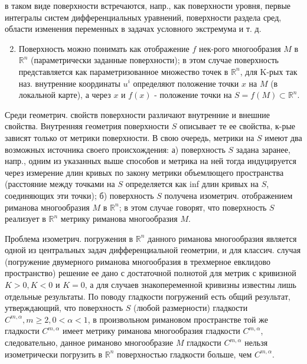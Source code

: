 \documentclass[10pt]{article}
\begin{document}
в таком виде поверхности встречаются, напр., как поверхности уровня, первые интегралы систем дифференциальных уравнений, поверхности раздела сред, области изменения переменных в задачах условного экстремума и т. д.



\begin{enumerate}

  \setcounter{enumi}{1}

  \item Поверхность можно понимать как отображение $f$ нек-рого многообразия $M$ в $\mathbb{R}^{n}$ (параметрически заданные поверхности); в этом случае поверхность представляется как параметризованное множество точек в $\mathbb{R}^{n}$, для K-рых так наз. внутренние координаты $u^{i}$ определяют положение точки $x$ на $M$ (в локальной карте), а через $x$ и $f(x)$ - положение точки на $S=f(M) \subset \mathbb{R}^{n}$.

\end{enumerate}



Среди геометрич. свойств поверхности различают внутренние и внешние свойства. Внутренняя геометрия поверхности $S$ описывает те ее свойства, к-рые зависят только от метрики поверхности. В свою очередь, метрики на $S$ имеют два возможных источника своего происхождения: а) поверхность $S$ задана заранее, напр., одним из указанных выше способов и метрика на ней тогда индуцируется через измерение длин кривых по закону метрики объемлющего пространства (расстояние между точками на $S$ определяется как inf длин кривых на $S$, соединяющих эти точки); б) поверхность $S$ получена изометрич. отображением риманова многообразия $M$ в $\mathbb{R}^{n}$; в этом случае говорят, что поверхность $S$ реализует в $\mathbb{R}^{n}$ метрику риманова многообразия $M$.



Проблема изометрич. погружения в $\mathbb{R}^{n}$ данного риманова многообразия является одной из центральных задач дифференциальной геометрии, и для классич. случая (погружение двумерного риманова многообразия в трехмерное евклидово пространство) решение ее дано с достаточной полнотой для метрик с кривизной $K>0, K<0$ и $K=0$, а для случаев знакопеременной кривизны известны лишь отдельные результаты. По поводу гладкости погружений есть общий результат, утверждающий, что поверхность $S$ (любой размерности) гладкости $C^{m, \alpha}, m \geqslant 2,0<\alpha<1$, в произвольном римановом пространстве той же гладкости $C^{m, \alpha}$ имеет метрику риманова многообразия гладкости $C^{m, \alpha}$, следовательно, данное риманово многообразие $M$ гладкости $C^{m, \alpha}$ нельзя изометрически погрузить в $\mathbb{R}^{n}$ поверхностью гладкости больше, чем $C^{m, \alpha}$.
\end{document}

